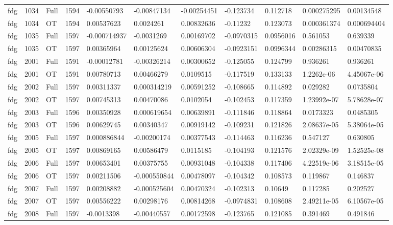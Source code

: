 \begin{landscape}
\begin{longtable}{lllllllllll}
fdg & 1034 & Full & 1594 & -0.00550793 & -0.00847134 & -0.00254451 & -0.123734 & 0.112718 & 0.000275295 & 0.00134548 \\
fdg & 1034 & OT & 1594 & 0.00537623 & 0.0024261 & 0.00832636 & -0.11232 & 0.123073 & 0.000361374 & 0.000694404 \\
fdg & 1035 & Full & 1597 & -0.000714937 & -0.0031269 & 0.00169702 & -0.0970315 & 0.0956016 & 0.561053 & 0.639339 \\
fdg & 1035 & OT & 1597 & 0.00365964 & 0.00125624 & 0.00606304 & -0.0923151 & 0.0996344 & 0.00286315 & 0.00470835 \\
fdg & 2001 & Full & 1591 & -0.00012781 & -0.00326214 & 0.00300652 & -0.125055 & 0.124799 & 0.936261 & 0.936261 \\
fdg & 2001 & OT & 1591 & 0.00780713 & 0.00466279 & 0.0109515 & -0.117519 & 0.133133 & 1.2262e-06 & 4.45067e-06 \\
fdg & 2002 & Full & 1597 & 0.00311337 & 0.000314219 & 0.00591252 & -0.108665 & 0.114892 & 0.029282 & 0.0735804 \\
fdg & 2002 & OT & 1597 & 0.00745313 & 0.00470086 & 0.0102054 & -0.102453 & 0.117359 & 1.23992e-07 & 5.78628e-07 \\
fdg & 2003 & Full & 1596 & 0.00350928 & 0.000619654 & 0.00639891 & -0.111846 & 0.118864 & 0.0173323 & 0.0485305 \\
fdg & 2003 & OT & 1596 & 0.00629745 & 0.00340347 & 0.00919142 & -0.109231 & 0.121826 & 2.08637e-05 & 5.38064e-05 \\
fdg & 2005 & Full & 1597 & 0.000886844 & -0.00200174 & 0.00377543 & -0.114463 & 0.116236 & 0.547127 & 0.630805 \\
fdg & 2005 & OT & 1597 & 0.00869165 & 0.00586479 & 0.0115185 & -0.104193 & 0.121576 & 2.02329e-09 & 1.52525e-08 \\
fdg & 2006 & Full & 1597 & 0.00653401 & 0.00375755 & 0.00931048 & -0.104338 & 0.117406 & 4.22519e-06 & 3.18515e-05 \\
fdg & 2006 & OT & 1597 & 0.00211506 & -0.000550844 & 0.00478097 & -0.104342 & 0.108573 & 0.119867 & 0.146837 \\
fdg & 2007 & Full & 1597 & 0.00208882 & -0.000525604 & 0.00470324 & -0.102313 & 0.10649 & 0.117285 & 0.202527 \\
fdg & 2007 & OT & 1597 & 0.00556222 & 0.00298176 & 0.00814268 & -0.0974831 & 0.108608 & 2.49211e-05 & 6.10567e-05 \\
fdg & 2008 & Full & 1597 & -0.0013398 & -0.00440557 & 0.00172598 & -0.123765 & 0.121085 & 0.391469 & 0.491846 \\

\end{longtable}
\end{landscape}
